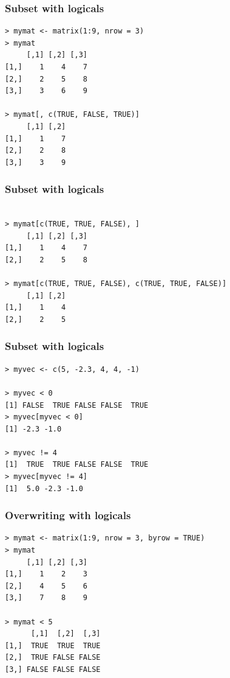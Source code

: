 \documentclass[xcolor=dvipsnames, xcolor=table]{beamer} %
\theoremstyle{mystyle}
\begin{document}
\begin{frame}[fragile] %
\frametitle{Subset with logicals}

\begin{verbatim}
> mymat <- matrix(1:9, nrow = 3)
> mymat
     [,1] [,2] [,3]
[1,]    1    4    7
[2,]    2    5    8
[3,]    3    6    9

> mymat[, c(TRUE, FALSE, TRUE)]
     [,1] [,2]
[1,]    1    7
[2,]    2    8
[3,]    3    9

\end{verbatim}

\end{frame}

\begin{frame}[fragile] %
\frametitle{Subset with logicals}

\begin{verbatim}

> mymat[c(TRUE, TRUE, FALSE), ]
     [,1] [,2] [,3]
[1,]    1    4    7
[2,]    2    5    8

> mymat[c(TRUE, TRUE, FALSE), c(TRUE, TRUE, FALSE)]
     [,1] [,2]
[1,]    1    4
[2,]    2    5
\end{verbatim}

\end{frame}

\begin{frame}[fragile] %

\frametitle{Subset with logicals}

\begin{verbatim}
> myvec <- c(5, -2.3, 4, 4, -1)
 
> myvec < 0
[1] FALSE  TRUE FALSE FALSE  TRUE
> myvec[myvec < 0]
[1] -2.3 -1.0
 
> myvec != 4
[1]  TRUE  TRUE FALSE FALSE  TRUE
> myvec[myvec != 4]
[1]  5.0 -2.3 -1.0
\end{verbatim}

\end{frame}

\begin{frame}[fragile] %

\frametitle{Overwriting with logicals}

\begin{verbatim}
> mymat <- matrix(1:9, nrow = 3, byrow = TRUE)
> mymat
     [,1] [,2] [,3]
[1,]    1    2    3
[2,]    4    5    6
[3,]    7    8    9

> mymat < 5
      [,1]  [,2]  [,3]
[1,]  TRUE  TRUE  TRUE
[2,]  TRUE FALSE FALSE
[3,] FALSE FALSE FALSE
\end{verbatim}

\end{frame}
\end{document}
